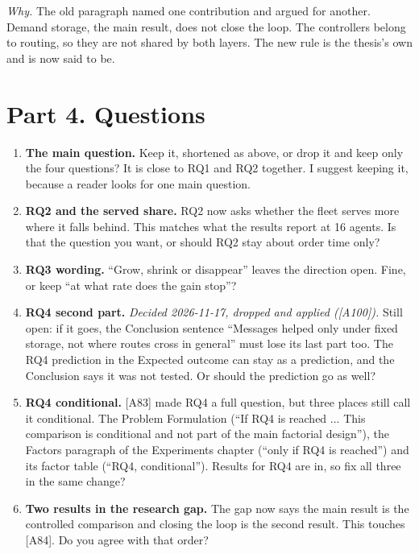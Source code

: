 \documentclass[11pt,a4paper]{article}
\newcommand{\why}[1]{\textcolor{notec}{\small\emph{Why.} #1}\par}
\begin{document}
\why{The old paragraph named one contribution and argued for another. Demand storage, the main
result, does not close the loop. The controllers belong to routing, so they are not shared by both
layers. The new rule is the thesis's own and is now said to be.}

\section*{Part 4. Questions}

\begin{enumerate}[leftmargin=1.6em]
\item \textbf{The main question.} Keep it, shortened as above, or drop it and keep only the four
  questions? It is close to RQ1 and RQ2 together. I suggest keeping it, because a reader looks for one
  main question.
\item \textbf{RQ2 and the served share.} RQ2 now asks whether the fleet serves more where it falls
  behind. This matches what the results report at 16 agents. Is that the question you want, or should
  RQ2 stay about order time only?
\item \textbf{RQ3 wording.} ``Grow, shrink or disappear'' leaves the direction open. Fine, or keep
  ``at what rate does the gain stop''?
\item \textbf{RQ4 second part.} \emph{Decided 2026-11-17, dropped and applied ([A100]).} Still open: if it goes, the Conclusion sentence ``Messages helped only under fixed
  storage, not where routes cross in general'' must lose its last part too. The RQ4 prediction in the
  Expected outcome can stay as a prediction, and the Conclusion says it was not tested. Or should the
  prediction go as well?
\item \textbf{RQ4 conditional.} [A83] made RQ4 a full question, but three places still call it
  conditional. The Problem Formulation (``If RQ4 is reached ... This comparison is conditional and not
  part of the main factorial design''), the Factors paragraph of the Experiments chapter (``only if
  RQ4 is reached'') and its factor table (``RQ4, conditional''). Results for RQ4 are in, so fix all
  three in the same change?
\item \textbf{Two results in the research gap.} The gap now says the main result is the controlled
  comparison and closing the loop is the second result. This touches [A84]. Do you agree with that
  order?
\end{enumerate}
\end{document}

